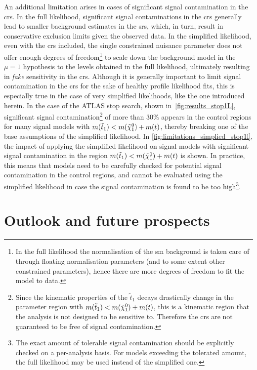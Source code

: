 An additional limitation arises in cases of significant signal contamination in the \glspl{cr}. In the full likelihood, significant signal contaminations in the \glspl{cr} generally lead to smaller background estimates in the \glspl{sr}, which, in turn, result in conservative exclusion limits given the observed data.
In the simplified likelihood, even with the \glspl{cr} included, the single constrained nuisance parameter does not offer enough degrees of freedom\footnote{In the full likelihood the normalisation of the \gls{sm} background is taken care of through floating normalisation parameters (and to some extent other constrained parameters), hence there are more degrees of freedom to fit the model to data.} to scale down the background model in the $\mu = 1$ hypothesis to the levels obtained in the full likelihood, ultimately resulting in \textit{fake} sensitivity in the \glspl{cr}.
Although it is generally important to limit signal contamination in the \glspl{cr} for the sake of healthy profile likelihood fits, this is especially true in the case of very simplified likelihoods, like the one introduced herein.
In the case of the ATLAS stop search, shown in~\cref{fig:results_stop1L}, significant signal contamination\footnote{Since the kinematic properties of the $\tilde{t}_1$ decays drastically change in the parameter region with $m(\tilde{t}_1) < m(\tilde{\chi}_1^0)+m(t)$, this is a kinematic region that the analysis is not designed to be sensitive to. Therefore the \glspl{cr} are not guaranteed to be free of signal contamination.} of more than 30\% appears in the control regions for many signal models with $m(\tilde{t}_1) < m(\tilde{\chi}_1^0)+m(t)$, thereby breaking one of the base assumptions of the simplified likelihood.
In \cref{fig:limitations_simplied_stop1l}, the impact of applying the simplified likelihood on signal models with significant signal contamination in the region $m(\tilde{t}_1) < m(\tilde{\chi}_1^0)+m(t)$ is shown. In practice, this means that models need to be carefully checked for potential signal contamination in the control regions, and cannot be evaluated using the simplified likelihood in case the signal contamination is found to be too high\footnote{The exact amount of tolerable signal contamination should be explicitly checked on a per-analysis basis. For models exceeding the tolerated amount, the full likelihood may be used instead of the simplified one.}.

\section{Outlook and future prospects}\label{sec:simplify_outlook}

